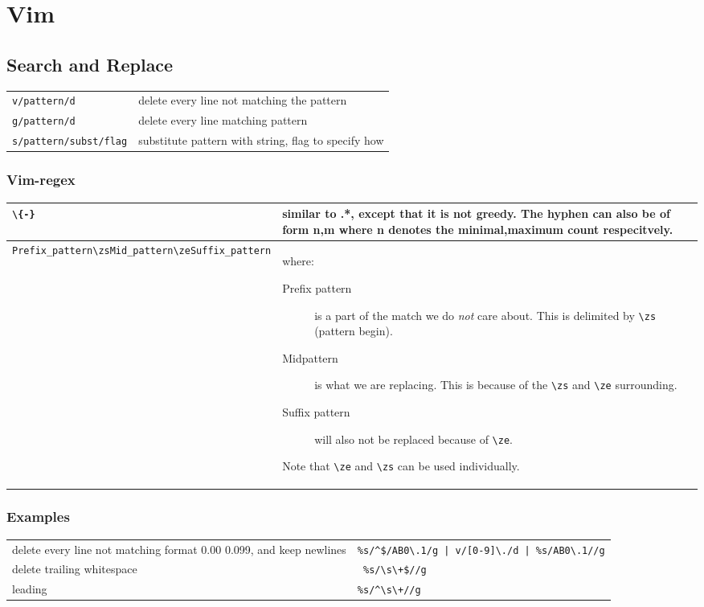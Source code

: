 \section{Vim}

\subsection{Search and Replace}
\begin{longtable}{l l}
    \verb|v/pattern/d| & delete every line not matching the pattern \\
    \verb|g/pattern/d| & delete every line matching pattern \\
    \verb|s/pattern/subst/flag| & substitute pattern with string,
                                  flag to specify how\\
\end{longtable}

\subsubsection{Vim-regex}

\begin{tabular}{|p{5cm}| p{10cm}|}
    \hline
    \verb~\{-}~ & similar to .*, except that it is not greedy. The hyphen can also
    be of form n,m where n denotes the minimal,maximum count respecitvely. \\
    \hline

    \verb~Prefix_pattern\zsMid_pattern\zeSuffix_pattern~
    & where:
    \begin{description}
        \item[Prefix pattern] is a part of the match we do \textit{not} care about.
            This is delimited by \verb~\zs~ (pattern begin).
        \item[Midpattern] is what we are replacing. This is because of the
            \verb~\zs~ and \verb~\ze~ surrounding.
        \item[Suffix pattern] will also not be replaced because of \verb~\ze~.
    \end{description}
    Note that \verb~\ze~ and \verb~\zs~ can be used individually.
\end{tabular}


\subsubsection{Examples}

\begin{longtable}{l l}
    delete every line not matching format 0.00 0.099, and keep newlines & 
    \verb~%s/^$/AB0\.1/g | v/[0-9]\./d | %s/AB0\.1//g~ \\
    delete trailing whitespace & \verb~ %s/\s\+$//g~ \\
    leading & \verb~%s/^\s\+//g~ \\
\end{longtable}
